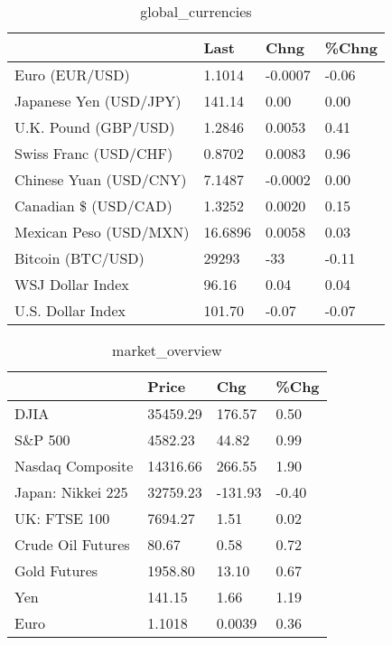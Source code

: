 \documentclass{article}%
\begin{document}
%


\begin{table}[htbp]%
\caption{global\_currencies}%
\centering%
\begin{adjustbox}{width=1\textwidth}%
\begin{tabular}{llll}
\toprule
                       &    Last &    Chng & \%Chng \\
\midrule
        Euro (EUR/USD) &  1.1014 & -0.0007 & -0.06 \\
Japanese Yen (USD/JPY) &  141.14 &    0.00 &  0.00 \\
  U.K. Pound (GBP/USD) &  1.2846 &  0.0053 &  0.41 \\
 Swiss Franc (USD/CHF) &  0.8702 &  0.0083 &  0.96 \\
Chinese Yuan (USD/CNY) &  7.1487 & -0.0002 &  0.00 \\
  Canadian \$ (USD/CAD) &  1.3252 &  0.0020 &  0.15 \\
Mexican Peso (USD/MXN) & 16.6896 &  0.0058 &  0.03 \\
     Bitcoin (BTC/USD) &   29293 &     -33 & -0.11 \\
      WSJ Dollar Index &   96.16 &    0.04 &  0.04 \\
     U.S. Dollar Index &  101.70 &   -0.07 & -0.07 \\
\bottomrule
\end{tabular}
%
\end{adjustbox}%
\end{table}

%


\begin{table}[htbp]%
\caption{market\_overview}%
\centering%
\begin{adjustbox}{width=1\textwidth}%
\begin{tabular}{llll}
\toprule
                  &    Price &     Chg &  \%Chg \\
\midrule
             DJIA & 35459.29 &  176.57 &  0.50 \\
          S\&P 500 &  4582.23 &   44.82 &  0.99 \\
 Nasdaq Composite & 14316.66 &  266.55 &  1.90 \\
Japan: Nikkei 225 & 32759.23 & -131.93 & -0.40 \\
     UK: FTSE 100 &  7694.27 &    1.51 &  0.02 \\
Crude Oil Futures &    80.67 &    0.58 &  0.72 \\
     Gold Futures &  1958.80 &   13.10 &  0.67 \\
              Yen &   141.15 &    1.66 &  1.19 \\
             Euro &   1.1018 &  0.0039 &  0.36 \\
\bottomrule
\end{tabular}
%
\end{adjustbox}%
\end{table}

%
\end{document}
